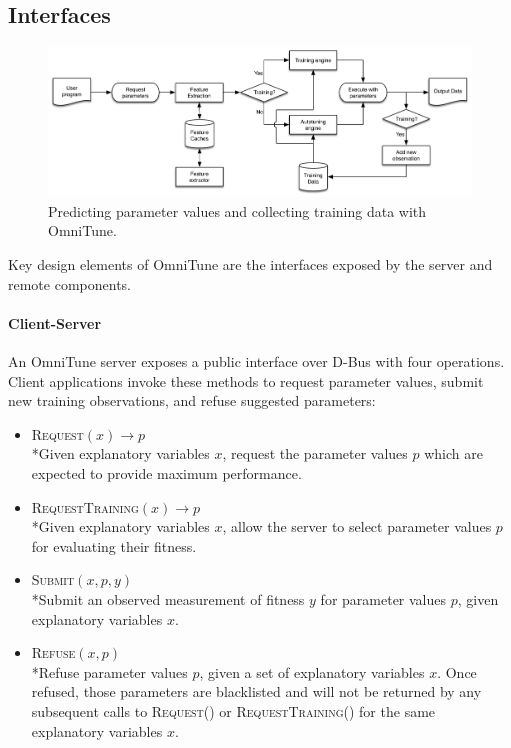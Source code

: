 \subsection{Interfaces}

\begin{figure}
\centering
\includegraphics[width=.75\columnwidth]{img/omnitune-system-flow.pdf}
\caption{%
  Predicting parameter values and collecting training data with
  OmniTune.%
}
\label{fig:omnitune-system-flow}
\end{figure}

Key design elements of OmniTune are the interfaces exposed by the
server and remote components.

\paragraph{Client-Server} An OmniTune server exposes a public
interface over D-Bus with four operations. Client applications invoke
these methods to request parameter values, submit new training
observations, and refuse suggested parameters:
%
\begin{itemize}
\item \textsc{Request}$(x) \to p$\\*Given explanatory variables $x$,
  request the parameter values $p$ which are expected to provide
  maximum performance.
\item \textsc{RequestTraining}$(x) \to p$\\*Given explanatory
  variables $x$, allow the server to select parameter values $p$ for
  evaluating their fitness.
\item \textsc{Submit}$(x, p, y)$\\*Submit an observed measurement of
  fitness $y$ for parameter values $p$, given explanatory variables
  $x$.
\item \textsc{Refuse}$(x, p)$\\*Refuse parameter values $p$, given a
  set of explanatory variables $x$. Once refused, those parameters are
  blacklisted and will not be returned by any subsequent calls to
  \textsc{Request()} or \textsc{RequestTraining()} for the same
  explanatory variables $x$.
\end{itemize}
%

